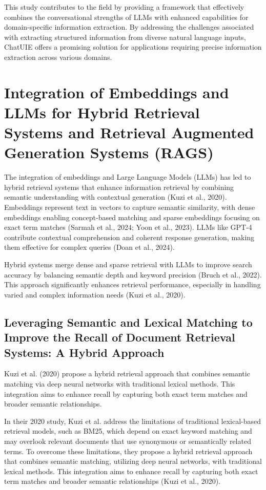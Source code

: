 This study contributes to the field by providing a framework that effectively combines the conversational strengths of LLMs with enhanced capabilities for domain-specific information extraction. By addressing the challenges associated with extracting structured information from diverse natural language inputs, ChatUIE offers a promising solution for applications requiring precise information extraction across various domains.

\section{Integration of Embeddings and LLMs for Hybrid Retrieval Systems and Retrieval Augmented Generation Systems (RAGS)}

The integration of embeddings and Large Language Models (LLMs) has led to hybrid retrieval systems that enhance information retrieval by combining semantic understanding with contextual generation (Kuzi et al., 2020). Embeddings represent text in vectors to capture semantic similarity, with dense embeddings enabling concept-based matching and sparse embeddings focusing on exact term matches (Sarmah et al., 2024; Yoon et al., 2023). LLMs like GPT-4 contribute contextual comprehension and coherent response generation, making them effective for complex queries (Doan et al., 2024).

Hybrid systems merge dense and sparse retrieval with LLMs to improve search accuracy by balancing semantic depth and keyword precision (Bruch et al., 2022). This approach significantly enhances retrieval performance, especially in handling varied and complex information needs (Kuzi et al., 2020).

\subsection{Leveraging Semantic and Lexical Matching to Improve the Recall of Document Retrieval Systems: A Hybrid Approach}

Kuzi et al. (2020) propose a hybrid retrieval approach that combines semantic matching via deep neural networks with traditional lexical methods. This integration aims to enhance recall by capturing both exact term matches and broader semantic relationships.

In their 2020 study, Kuzi et al. address the limitations of traditional lexical-based retrieval models, such as BM25, which depend on exact keyword matching and may overlook relevant documents that use synonymous or semantically related terms. To overcome these limitations, they propose a hybrid retrieval approach that combines semantic matching, utilizing deep neural networks, with traditional lexical methods. This integration aims to enhance recall by capturing both exact term matches and broader semantic relationships (Kuzi et al., 2020).

